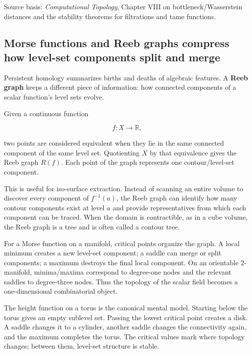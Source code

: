 Source basis: \emph{Computational Topology}, Chapter VIII on bottleneck/Wasserstein distances and the stability theorems for filtrations and tame functions.

\subsection{Morse functions and Reeb graphs compress how level-set components split and merge}\label{03-visual-computing-i-ch002-morse-functions-and-reeb-graphs-compress-how-level-set-components-split-and-merge}

\hypertarget{03-visual-computing-i-ch002-morse-functions-and-reeb-graphs-compress-how-level-set-components-split-and-merge}{}

Persistent homology summarizes births and deaths of algebraic features. A \textbf{Reeb graph} keeps a different piece of information: how connected components of a scalar function's level sets evolve.

Given a continuous function

\[
f:X\rightarrow\mathbb R,
\]

two points are considered equivalent when they lie in the same connected component of the same level set. Quotienting \(X\) by that equivalence gives the Reeb graph \(R(f)\). Each point of the graph represents one contour/level-set component.

This is useful for iso-surface extraction. Instead of scanning an entire volume to discover every component of \(f^{-1}(a)\), the Reeb graph can identify how many contour components exist at level \(a\) and provide representatives from which each component can be traced. When the domain is contractible, as in a cube volume, the Reeb graph is a tree and is often called a contour tree.

For a Morse function on a manifold, critical points organize the graph. A local minimum creates a new level-set component; a saddle can merge or split components; a maximum destroys the final local component. On an orientable 2-manifold, minima/maxima correspond to degree-one nodes and the relevant saddles to degree-three nodes. Thus the topology of the scalar field becomes a one-dimensional combinatorial object.

The height function on a torus is the canonical mental model. Starting below the torus gives an empty sublevel set. Passing the lowest critical point creates a disk. A saddle changes it to a cylinder, another saddle changes the connectivity again, and the maximum completes the torus. The critical values mark where topology changes; between them, level-set structure is stable.

